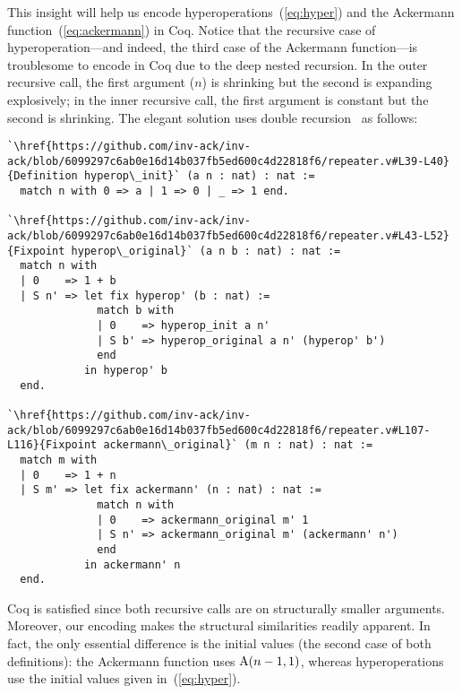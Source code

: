 This insight will help us encode hyperoperations~(\ref{eq:hyper}) and the Ackermann function~(\ref{eq:ackermann}) in Coq.  Notice that the recursive case of hyperoperation---and
indeed, the third case of the Ackermann function---is troublesome to encode in Coq due to
the deep nested recursion.  In the outer recursive call, the first argument ($n$) is shrinking
but the second is expanding explosively; in the inner recursive call, the first argument is
constant but the second is shrinking. The elegant solution uses double recursion~\cite{bertotcast} as follows:
\begin{lstlisting}
`\href{https://github.com/inv-ack/inv-ack/blob/6099297c6ab0e16d14b037fb5ed600c4d22818f6/repeater.v#L39-L40}{Definition hyperop\_init}` (a n : nat) : nat :=
  match n with 0 => a | 1 => 0 | _ => 1 end.

`\href{https://github.com/inv-ack/inv-ack/blob/6099297c6ab0e16d14b037fb5ed600c4d22818f6/repeater.v#L43-L52}{Fixpoint hyperop\_original}` (a n b : nat) : nat :=
  match n with
  | 0    => 1 + b
  | S n' => let fix hyperop' (b : nat) :=
              match b with
              | 0    => hyperop_init a n'
              | S b' => hyperop_original a n' (hyperop' b')
              end
            in hyperop' b
  end.

`\href{https://github.com/inv-ack/inv-ack/blob/6099297c6ab0e16d14b037fb5ed600c4d22818f6/repeater.v#L107-L116}{Fixpoint ackermann\_original}` (m n : nat) : nat :=
  match m with
  | 0    => 1 + n
  | S m' => let fix ackermann' (n : nat) : nat :=
              match n with
              | 0    => ackermann_original m' 1
              | S n' => ackermann_original m' (ackermann' n')
              end
            in ackermann' n
  end.
\end{lstlisting}
Coq is satisfied since both recursive calls are on structurally smaller arguments.
Moreover, our encoding makes the structural similarities
 readily apparent.  In fact, the only essential difference is the initial values
(the second case of both definitions): the Ackermann function uses $\text{A}(n-1,1)$, whereas
hyperoperations use the initial values given in~(\ref{eq:hyper}).

